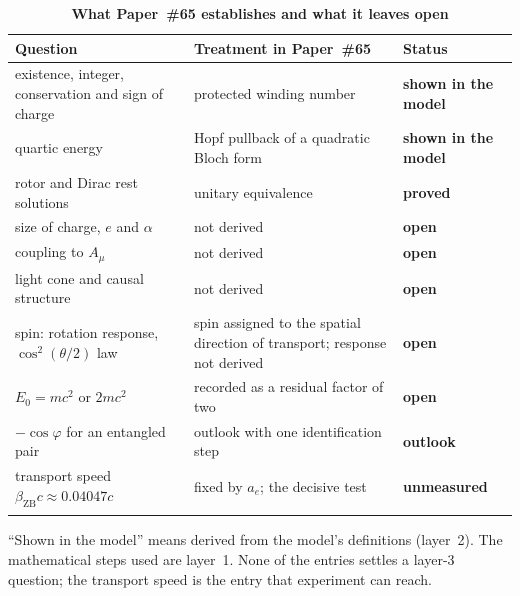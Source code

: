 \documentclass[%
 reprint, amsmath,amssymb, aps, prb, ]{revtex4-2}
\numberwithin{equation}{section}
\newcommand{\betaZB}{\beta_{\text{ZB}}}
\begin{document}
\begin{table}[t!]
\centering
\caption{\textbf{What Paper~\#65 establishes and what it leaves open}}
\label{tab:g_open}
\renewcommand{\arraystretch}{1.4}
\setlength{\tabcolsep}{8pt}
\begin{tabular}{>{\raggedright\arraybackslash}p{5.6cm}>{\raggedright\arraybackslash}p{6.2cm}>{\raggedright\arraybackslash}p{2.8cm}}
\toprule
\textbf{Question} & \textbf{Treatment in Paper~\#65} & \textbf{Status} \\
\midrule
existence, integer, conservation and sign of charge & protected winding number & \textcolor{pass}{\textbf{shown in the model}} \\
\addlinespace[0.3cm]
quartic energy & Hopf pullback of a quadratic Bloch form & \textcolor{pass}{\textbf{shown in the model}} \\
\addlinespace[0.3cm]
rotor and Dirac rest solutions & unitary equivalence & \textcolor{pass}{\textbf{proved}} \\
\addlinespace[0.3cm]
size of charge, $e$ and $\alpha$ & not derived & \textcolor{fail}{\textbf{open}} \\
\addlinespace[0.3cm]
coupling to $A_\mu$ & not derived & \textcolor{fail}{\textbf{open}} \\
\addlinespace[0.3cm]
light cone and causal structure & not derived & \textcolor{fail}{\textbf{open}} \\
\addlinespace[0.3cm]
spin: rotation response, $\cos^{2}(\theta/2)$ law & spin assigned to the spatial direction of transport; response not derived & \textcolor{fail}{\textbf{open}} \\
\addlinespace[0.3cm]
$E_0 = mc^{2}$ or $2mc^{2}$ & recorded as a residual factor of two & \textcolor{fail}{\textbf{open}} \\
\addlinespace[0.3cm]
$-\cos\varphi$ for an entangled pair & outlook with one identification step & \textcolor{kB}{\textbf{outlook}} \\
\addlinespace[0.3cm]
transport speed $\betaZB c \approx 0.04047c$ & fixed by $a_e$; the decisive test & \textcolor{kB}{\textbf{unmeasured}} \\
\addlinespace[0.2cm]
\bottomrule
\end{tabular}
\vspace{0.2cm}
\begin{minipage}{0.95\textwidth}
\justifying\footnotesize
``Shown in the model'' means derived from the model's definitions (layer~2). The mathematical steps used are layer~1. None of the entries settles a layer-3 question; the transport speed is the entry that experiment can reach.
\end{minipage}
\end{table}
\end{document}
